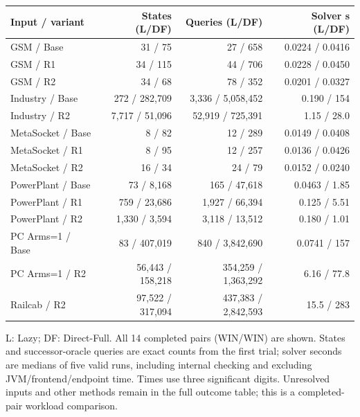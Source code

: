 \begingroup\small
\setlength{\tabcolsep}{3pt}
\renewcommand{\arraystretch}{1.04}
\begin{tabular}{@{}lrrr@{}}\toprule
Input / variant & States (L/DF) & Queries (L/DF) & Solver s (L/DF)\\\midrule
GSM / Base & 31 / 75 & 27 / 658 & 0.0224 / 0.0416\\
GSM / R1 & 34 / 115 & 44 / 706 & 0.0228 / 0.0450\\
GSM / R2 & 34 / 68 & 78 / 352 & 0.0201 / 0.0327\\
Industry / Base & 272 / 282,709 & 3,336 / 5,058,452 & 0.190 / 154\\
Industry / R2 & 7,717 / 51,096 & 52,919 / 725,391 & 1.15 / 28.0\\
MetaSocket / Base & 8 / 82 & 12 / 289 & 0.0149 / 0.0408\\
MetaSocket / R1 & 8 / 95 & 12 / 257 & 0.0136 / 0.0426\\
MetaSocket / R2 & 16 / 34 & 24 / 79 & 0.0152 / 0.0240\\
PowerPlant / Base & 73 / 8,168 & 165 / 47,618 & 0.0463 / 1.85\\
PowerPlant / R1 & 759 / 23,686 & 1,927 / 66,394 & 0.125 / 5.51\\
PowerPlant / R2 & 1,330 / 3,594 & 3,118 / 13,512 & 0.180 / 1.01\\
PC Arms=1 / Base & 83 / 407,019 & 840 / 3,842,690 & 0.0741 / 157\\
PC Arms=1 / R2 & 56,443 / 158,218 & 354,259 / 1,363,292 & 6.16 / 77.8\\
Railcab / R2 & 97,522 / 317,094 & 437,383 / 2,842,593 & 15.5 / 283\\
\bottomrule\end{tabular}\par
\smallskip\raggedright
L: Lazy; DF: Direct-Full. All 14 completed pairs (WIN/WIN) are shown. States and successor-oracle queries are exact counts from the first trial; solver seconds are medians of five valid runs, including internal checking and excluding JVM/frontend/endpoint time. Times use three significant digits. Unresolved inputs and other methods remain in the full outcome table; this is a completed-pair workload comparison.
\par\endgroup
